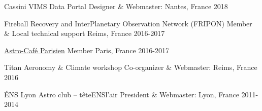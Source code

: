 
\begin{cventries}

  \cventry
    {Cassini VIMS Data Portal}
    {Designer \& Webmaster: }
    {Nantes, France}
    {2018}
    {}

    \cventry
    {Fireball Recovery and InterPlanetary Observation Network (FRIPON)}
    {Member \& Local technical support}
    {Reims, France}
    {2016-2017}
    {}

  \cventry
    {\href{https://cafeastroparisien.wordpress.com/}{Astro-Café Parisien}}
    {Member}
    {Paris, France}
    {2016-2017}
    {}

  \cventry
    {Titan Aeronomy \& Climate workshop}
    {Co-organizer \& Webmaster: }
    {Reims, France}
    {2016}
    {}

  \cventry
    {ÉNS Lyon Astro club -- têteENSl'air}
    {President \& Webmaster: }
    {Lyon, France}
    {2011-2014}
    {}

\end{cventries}
